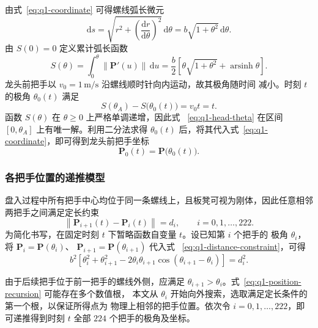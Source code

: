 \documentclass[UTF8,fontset=windows,a4paper,12pt]{ctexart}
\begin{document}
由式~\eqref{eq:q1-coordinate} 可得螺线弧长微元
\begin{equation}
  \mathrm{d}s
  =\sqrt{r^2+\left(\frac{\mathrm{d}r}{\mathrm{d}\theta}\right)^2}
   \,\mathrm{d}\theta
  =b\sqrt{1+\theta^2}\,\mathrm{d}\theta.
  \label{eq:q1-arc-element}
\end{equation}
由 $S(0)=0$ 定义累计弧长函数
\begin{equation}
  S(\theta)
  =\int_0^\theta \left\|\bm P'(u)\right\|\,\mathrm{d}u
  =\frac{b}{2}
  \left[
    \theta\sqrt{1+\theta^2}
    +\operatorname{arsinh}\theta
  \right].
  \label{eq:q1-arc-length}
\end{equation}
龙头前把手以 $v_0=1\,\mathrm{m/s}$ 沿螺线顺时针向内运动，故其极角随时间
减小。时刻 $t$ 的极角 $\theta_0(t)$ 满足
\begin{equation}
  S(\theta_A)-S\bigl(\theta_0(t)\bigr)=v_0t=t.
  \label{eq:q1-head-theta}
\end{equation}
函数 $S(\theta)$ 在 $\theta\geq 0$ 上严格单调递增，因此式
~\eqref{eq:q1-head-theta} 在区间 $[0,\theta_A]$ 上有唯一解。利用二分法求得
$\theta_0(t)$ 后，将其代入式~\eqref{eq:q1-coordinate}，即可得到龙头前把手坐标
\begin{equation}
  \bm P_0(t)=\bm P\bigl(\theta_0(t)\bigr).
  \label{eq:q1-head-position}
\end{equation}

\subsubsection{各把手位置的递推模型}

盘入过程中所有把手中心均位于同一条螺线上，且板凳可视为刚体，因此任意相邻
两把手之间满足定长约束
\begin{equation}
  \left\|\bm P_{i+1}(t)-\bm P_i(t)\right\|=d_i,
  \qquad i=0,1,\ldots,222.
  \label{eq:q1-distance-constraint}
\end{equation}
为简化书写，在固定时刻 $t$ 下暂略函数自变量 $t$。设已知第 $i$ 个把手的
极角 $\theta_i$，将 $\bm P_i=\bm P(\theta_i)$、
$\bm P_{i+1}=\bm P(\theta_{i+1})$ 代入式
~\eqref{eq:q1-distance-constraint}，可得
\begin{equation}
  b^2\left[
    \theta_i^2+\theta_{i+1}^2
    -2\theta_i\theta_{i+1}
      \cos(\theta_{i+1}-\theta_i)
  \right]=d_i^2.
  \label{eq:q1-position-recursion}
\end{equation}

由于后续把手位于前一把手的螺线外侧，应满足
$\theta_{i+1}>\theta_i$。式~\eqref{eq:q1-position-recursion} 可能存在多个数值根，
本文从 $\theta_i$ 开始向外搜索，选取满足定长条件的第一个根，以保证所得点为
物理上相邻的把手位置。依次令 $i=0,1,\ldots,222$，即可递推得到时刻 $t$
全部 $224$ 个把手的极角及坐标。
\end{document}
